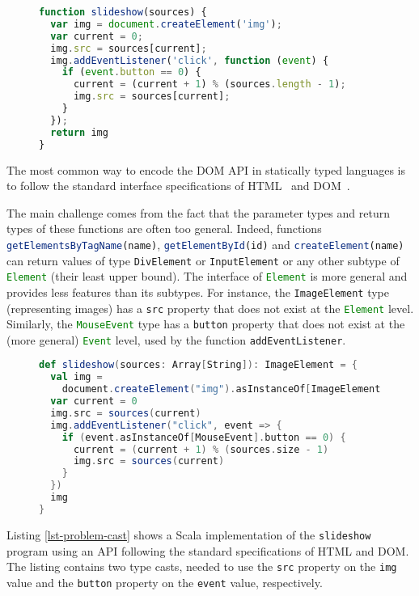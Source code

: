 \documentclass{llncs}
\newcommand{\jscode}[1]{\lstinline[language=JavaScript]|#1|}
\newcommand{\scalacode}[1]{\lstinline[language=Scala]|#1|}
\begin{document}
\begin{figure}
\begin{lstlisting}[label=lst-problem,language=JavaScript,caption=JavaScript function creating a slide show from an array of image URLs]
function slideshow(sources) {
  var img = document.createElement('img');
  var current = 0;
  img.src = sources[current];
  img.addEventListener('click', function (event) {
    if (event.button == 0) {
      current = (current + 1) % (sources.length - 1);
      img.src = sources[current];
    }
  });
  return img
}
\end{lstlisting}
\end{figure}

The most common way to encode the DOM API in statically typed languages is to follow the standard interface specifications of HTML~\cite{Raggett99_HTML} and DOM~\cite{w3c2004document}. 

The main challenge comes from the fact that the parameter types and return types of these functions are often too general. Indeed, functions \jscode{getElementsByTagName(name)}, \jscode{getElementById(id)} and \jscode{createElement(name)} can return values of type \jscode{DivElement} or \jscode{InputElement} or any other subtype of \jscode{Element} (their least upper bound). The interface of \jscode{Element} is more general and provides less features than its subtypes. For instance, the \jscode{ImageElement} type (representing images) has a \jscode{src} property that does not exist at the \jscode{Element} level. Similarly, the \jscode{MouseEvent} type has a \jscode{button} property that does not exist at the (more general) \jscode{Event} level, used by the function \jscode{addEventListener}.

\begin{figure}
\begin{lstlisting}[label=lst-problem-cast,language=Scala,caption={Scala implementation of \texttt{slideshow} using the standard HTML and DOM API}]
def slideshow(sources: Array[String]): ImageElement = {
  val img =
    document.createElement("img").asInstanceOf[ImageElement]
  var current = 0
  img.src = sources(current)
  img.addEventListener("click", event => {
    if (event.asInstanceOf[MouseEvent].button == 0) {
      current = (current + 1) % (sources.size - 1)
      img.src = sources(current)
    }
  })
  img
}
\end{lstlisting}
\end{figure}

Listing \ref{lst-problem-cast} shows a Scala implementation of the \jscode{slideshow} program using an API following the standard specifications of HTML and DOM. The listing contains two type casts, needed to use the \scalacode{src} property on the \scalacode{img} value and the \scalacode{button} property on the \scalacode{event} value, respectively.
\end{document}
